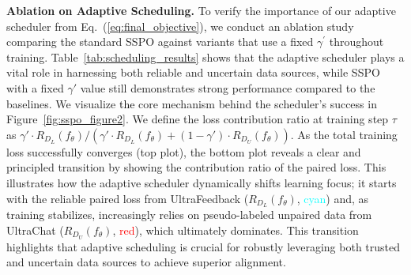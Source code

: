 \documentclass{article} %
\newcommand\fix[1]{\textcolor{black}{#1}}
\begin{document}
\noindent\textbf{Ablation on Adaptive Scheduling.}
To verify the importance of our adaptive scheduler from Eq.~(\ref{eq:final_objective}), we conduct an ablation study comparing the standard SSPO against variants that use a fixed $\gamma^{\prime}$ throughout training. Table~\ref{tab:scheduling_results} shows that the adaptive scheduler plays a vital role in harnessing both reliable and uncertain data sources, while SSPO with a fixed $\gamma'$ value still demonstrates strong performance compared to the baselines. \! \! \! We visualize \fix{the} core mechanism behind the scheduler's success in Figure~\ref{fig:sspo_figure2}. We define the loss contribution ratio at training step $\tau$ as $\gamma' \cdot R_{D_L}(f_\theta)/(\gamma' \cdot R_{D_L}(f_\theta) + (1 - \gamma') \cdot R_{D_U}(f_\theta))$. As the total training loss successfully converges (top plot), the bottom plot reveals a clear and principled transition by showing the contribution ratio of the paired loss. This illustrates how the adaptive scheduler dynamically shifts learning focus; it starts with the reliable paired loss from UltraFeedback ($R_{D_L}(f_\theta)$, \textcolor{cyan}{cyan}) and, as training stabilizes, increasingly relies on pseudo-labeled unpaired data from UltraChat ($R_{D_U}(f_\theta)$, \textcolor{red}{red}), which ultimately dominates. This transition highlights that adaptive scheduling is crucial for robustly leveraging both trusted and uncertain data sources to achieve superior alignment.
\end{document}
